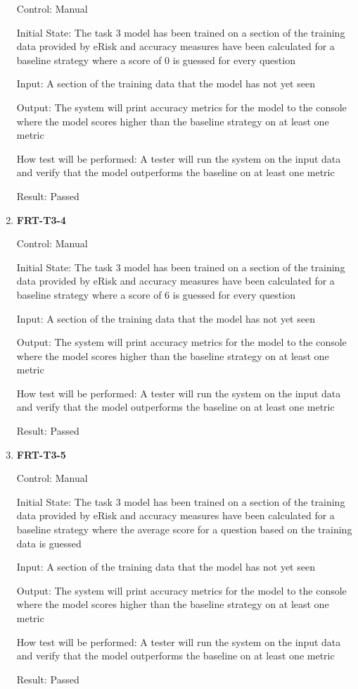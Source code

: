 \documentclass[12pt, titlepage]{article}
\begin{document}
\begin{enumerate}
Control: Manual


Initial State: The task 3 model has been trained on a section of the training data provided by eRisk and accuracy measures have been calculated for a baseline strategy where a score of 0 is guessed for every question


Input: A section of the training data that the model has not yet seen


Output: The system will print accuracy metrics for the model to the console where the model scores higher than the baseline strategy on at least one metric


How test will be performed: A tester will run the system on the input data and verify that the model outperforms the baseline on at least one metric


Result: Passed


\item \textbf{FRT-T3-4}


Control: Manual


Initial State: The task 3 model has been trained on a section of the training data provided by eRisk and accuracy measures have been calculated for a baseline strategy where a score of 6 is guessed for every question


Input: A section of the training data that the model has not yet seen


Output: The system will print accuracy metrics for the model to the console where the model scores higher than the baseline strategy on at least one metric


How test will be performed: A tester will run the system on the input data and verify that the model outperforms the baseline on at least one metric


Result: Passed


\item \textbf{FRT-T3-5}


Control: Manual


Initial State: The task 3 model has been trained on a section of the training data provided by eRisk and accuracy measures have been calculated for a baseline strategy where the average score for a question based on the training data is guessed


Input: A section of the training data that the model has not yet seen


Output: The system will print accuracy metrics for the model to the console where the model scores higher than the baseline strategy on at least one metric


How test will be performed: A tester will run the system on the input data and verify that the model outperforms the baseline on at least one metric


Result: Passed


\end{enumerate}
\end{document}

